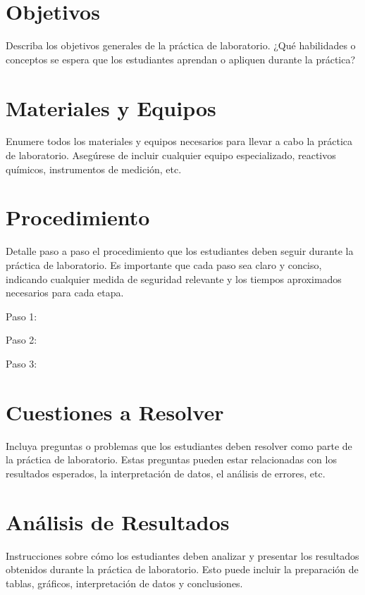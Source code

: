 \documentclass[12pt]{article}
\begin{document}
\datosguia
\lineablanco

\section{Objetivos}
Describa los objetivos generales de la práctica de laboratorio. ¿Qué
habilidades o conceptos se espera que los estudiantes aprendan o apliquen
durante la práctica?

\section{Materiales y Equipos}
Enumere todos los materiales y equipos necesarios para llevar a cabo la
práctica de laboratorio. Asegúrese de incluir cualquier equipo
especializado, reactivos químicos, instrumentos de medición, etc.

\section{Procedimiento}
Detalle paso a paso el procedimiento que los estudiantes deben seguir
durante la práctica de laboratorio. Es importante que cada paso sea claro
y conciso, indicando cualquier medida de seguridad relevante y los tiempos
aproximados necesarios para cada etapa.
\lineablanco
\begin{pasos}
  \item Paso 1:
  \item Paso 2:
  \item Paso 3:
\end{pasos}

\section{Cuestiones a Resolver}
Incluya preguntas o problemas que los estudiantes deben resolver como
parte de la práctica de laboratorio. Estas preguntas pueden estar
relacionadas con los resultados esperados, la interpretación de datos, el
análisis de errores, etc.

\section{Análisis de Resultados}
Instrucciones sobre cómo los estudiantes deben analizar y presentar los
resultados obtenidos durante la práctica de laboratorio. Esto puede
incluir la preparación de tablas, gráficos, interpretación de datos y
conclusiones.
\end{document}
